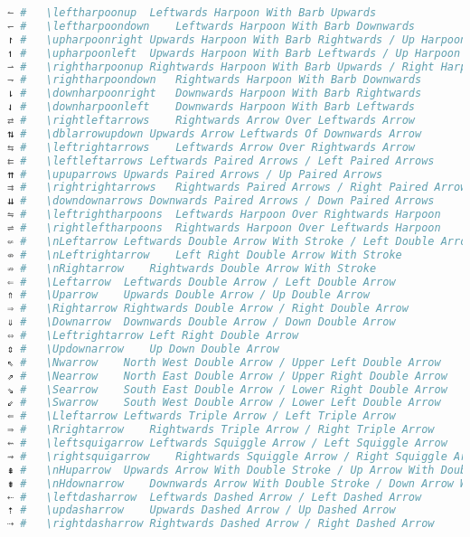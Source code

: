 \begin{lstlisting}[language=Julia, linewidth=\textwidth]
↼ #   \leftharpoonup  Leftwards Harpoon With Barb Upwards
↽ #   \leftharpoondown    Leftwards Harpoon With Barb Downwards
↾ #   \upharpoonright Upwards Harpoon With Barb Rightwards / Up Harpoon With Barb Right
↿ #   \upharpoonleft  Upwards Harpoon With Barb Leftwards / Up Harpoon With Barb Left
⇀ #   \rightharpoonup Rightwards Harpoon With Barb Upwards / Right Harpoon With Barb Up
⇁ #   \rightharpoondown   Rightwards Harpoon With Barb Downwards
⇂ #   \downharpoonright   Downwards Harpoon With Barb Rightwards
⇃ #   \downharpoonleft    Downwards Harpoon With Barb Leftwards
⇄ #   \rightleftarrows    Rightwards Arrow Over Leftwards Arrow
⇅ #   \dblarrowupdown Upwards Arrow Leftwards Of Downwards Arrow
⇆ #   \leftrightarrows    Leftwards Arrow Over Rightwards Arrow
⇇ #   \leftleftarrows Leftwards Paired Arrows / Left Paired Arrows
⇈ #   \upuparrows Upwards Paired Arrows / Up Paired Arrows
⇉ #   \rightrightarrows   Rightwards Paired Arrows / Right Paired Arrows
⇊ #   \downdownarrows Downwards Paired Arrows / Down Paired Arrows
⇋ #   \leftrightharpoons  Leftwards Harpoon Over Rightwards Harpoon
⇌ #   \rightleftharpoons  Rightwards Harpoon Over Leftwards Harpoon
⇍ #   \nLeftarrow Leftwards Double Arrow With Stroke / Left Double Arrow With Stroke
⇎ #   \nLeftrightarrow    Left Right Double Arrow With Stroke
⇏ #   \nRightarrow    Rightwards Double Arrow With Stroke
⇐ #   \Leftarrow  Leftwards Double Arrow / Left Double Arrow
⇑ #   \Uparrow    Upwards Double Arrow / Up Double Arrow
⇒ #   \Rightarrow Rightwards Double Arrow / Right Double Arrow
⇓ #   \Downarrow  Downwards Double Arrow / Down Double Arrow
⇔ #   \Leftrightarrow Left Right Double Arrow
⇕ #   \Updownarrow    Up Down Double Arrow
⇖ #   \Nwarrow    North West Double Arrow / Upper Left Double Arrow
⇗ #   \Nearrow    North East Double Arrow / Upper Right Double Arrow
⇘ #   \Searrow    South East Double Arrow / Lower Right Double Arrow
⇙ #   \Swarrow    South West Double Arrow / Lower Left Double Arrow
⇚ #   \Lleftarrow Leftwards Triple Arrow / Left Triple Arrow
⇛ #   \Rrightarrow    Rightwards Triple Arrow / Right Triple Arrow
⇜ #   \leftsquigarrow Leftwards Squiggle Arrow / Left Squiggle Arrow
⇝ #   \rightsquigarrow    Rightwards Squiggle Arrow / Right Squiggle Arrow
⇞ #   \nHuparrow  Upwards Arrow With Double Stroke / Up Arrow With Double Stroke
⇟ #   \nHdownarrow    Downwards Arrow With Double Stroke / Down Arrow With Double Stroke
⇠ #   \leftdasharrow  Leftwards Dashed Arrow / Left Dashed Arrow
⇡ #   \updasharrow    Upwards Dashed Arrow / Up Dashed Arrow
⇢ #   \rightdasharrow Rightwards Dashed Arrow / Right Dashed Arrow

\end{lstlisting}
